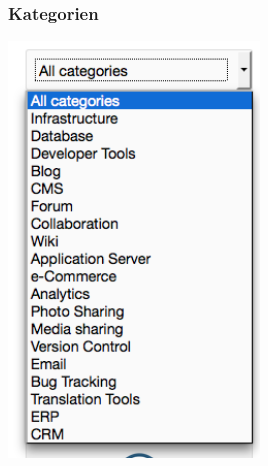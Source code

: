 \documentclass[11pt]{scrartcl}
\begin{document}
\subsubsection{Kategorien}
\includegraphics[width=0.5\textwidth]{categories}
\end{document}
